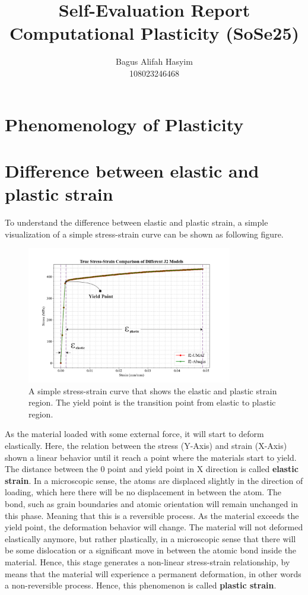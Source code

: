 \documentclass[12pt]{article}
\title{Self-Evaluation Report \\ \large Computational Plasticity (SoSe25)}
\author{Bagus Alifah Hasyim \\ 108023246468}
\date{}
\begin{document}
\maketitle

\section*{Phenomenology of Plasticity}

\section{Difference between elastic and plastic strain}
\hspace{2em}To understand the difference between elastic and plastic strain, a simple visualization of a simple stress-strain
curve can be shown as following figure. 
\begin{figure}[H]
    \centering
    \includegraphics[width=0.8\textwidth]{images/StressStrain.png}
    \caption{A simple stress-strain curve that shows the elastic and plastic strain region. The yield point is the transition point from 
    elastic to plastic region.}
    \label{fig:stress_strain_curve}
\end{figure}

\hspace{2em}
As the material loaded with some external force, it will start to deform elastically. Here, the relation
between the stress (Y-Axis) and strain (X-Axis) shown a linear behavior until it reach a point where the materials start to yield.
The distance between the 0 point and yield point in X direction is called \textbf{elastic strain}. In a microscopic sense, the atoms are
displaced slightly in the direction of loading, which here there will be no displacement in between the atom. The bond, such 
as grain boundaries and atomic orientation will remain unchanged in this phase. Meaning that this is a reversible process. As the material exceeds the yield point, the deformation behavior will change. The material will not deformed elastically anymore, 
but rather plastically, in a microscopic sense that there will be some dislocation or a significant move in between the atomic bond
inside the material. Hence, this stage generates a non-linear stress-strain relationship, by means that the material will experience
a permanent deformation, in other words a non-reversible process. Hence, this phenomenon is called \textbf{plastic strain}. 
\end{document}
